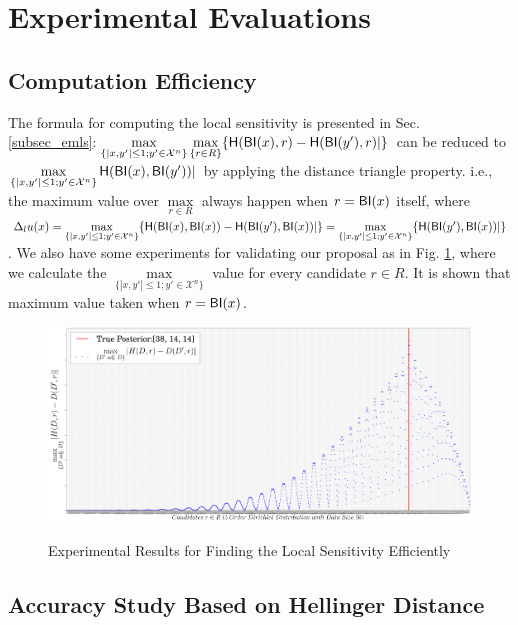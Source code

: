 \section{Experimental Evaluations}
\subsection{Computation Efficiency}
The formula for computing the local sensitivity is presented in Sec. \ref{subsec_emls}:$\max\limits_{\{|x,y'| \leq 1; y'\in \mathcal{X}^n\}}\max\limits_{\{r\in R\}} \{\mathsf{H}(\mathsf{BI}(x), r) - \mathsf{H}(\mathsf{BI}(y'), r)|\}$ can be reduced to $\max\limits_{\{|x,y'| \leq 1;y'\in \mathcal{X}^n\}}\mathsf{H}(\mathsf{BI}(x), \mathsf{BI}(y'))|$ by applying the distance triangle property. i.e., the maximum value over $\max\limits_{r \in R}$ always happen when $r = \mathsf{BI}(x)$ itself, where $\Delta_{l}u(x) = \max\limits_{\{|x,y'| \leq 1;y'\in \mathcal{X}^n\}} \{\mathsf{H}(\mathsf{BI}(x), \mathsf{BI}(x)) - \mathsf{H}(\mathsf{BI}(y'), \mathsf{BI}(x))|\} = \max\limits_{\{|x,y'| \leq 1;y'\in \mathcal{X}^n\}} \{\mathsf{H}(\mathsf{BI}(y'), \mathsf{BI}(x))|\}$. We also have some experiments for validating our proposal as in Fig. \ref{fig_efficiency}, where we calculate the $\max\limits_{\{|x,y'| \leq 1;y'\in \mathcal{X}^n\}}$ value for every candidate $r \in R$. It is shown that maximum value taken when  $r = \mathsf{BI}(x)$.

 \begin{figure}[h]
\centering
\includegraphics[width=1.0\textwidth]{efficiency}
\label{fig_efficiency}
\caption{Experimental Results for Finding the Local Sensitivity Efficiently}
\end{figure}

\subsection{Accuracy Study Based on Hellinger Distance}

